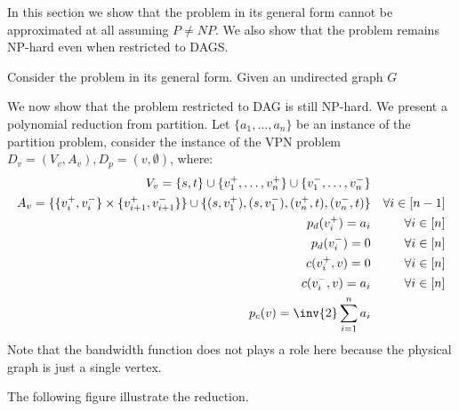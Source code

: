 In this section we show that the problem in its general form cannot be
approximated at all assuming $P \neq NP$.
We also show that the problem remains NP-hard even when restricted to DAGS.

Consider the problem in its general form. 
Given an undirected graph $G$

We now show that the problem restricted to DAG is still NP-hard.
We present a polynomial reduction from partition.
Let $\{a_1, \ldots, a_n\}$ be an instance of the partition problem, 
consider the instance of the VPN problem 
$D_v = (V_v, A_v), D_p = ({v}, \emptyset)$, 
where:
\begin{align}
V_v = \{s, t\} \cup \{v_1^+, \ldots, v_n^+\} \cup \{v_1^-, \ldots, v_n^-\}
\\
A_v = \{\{v_i^+, v_i^-\} \times \{v_{i + 1}^+, v_{i + 1}^-\}\} 
\cup \{(s, v_1^+), (s, v_1^-), (v_n^+, t), (v_n^-, t)\}
&&
\forall i \in [n-1]
\\
p_d(v_i^+) = a_i && \forall i \in [n]
\\
p_d(v_i^-) = 0 && \forall i \in [n]
\\
c(v_i^+, v) = 0 && \forall i \in [n]
\\
c(v_i^-, v) = a_i && \forall i \in [n] 
\\
p_c(v) = \inv{2}\sum_{i = 1}^n a_i
\end{align}
Note that the bandwidth function does not plays a role here because the physical graph
is just a single vertex.

The following figure illustrate the reduction.
\begin{figure}[ht]
\centering

\end{figure}
